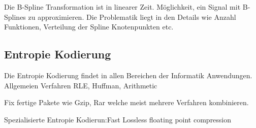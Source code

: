  Die B-Spline Transformation \cite{unser1993b:spline} ist in linearer Zeit. Möglichkeit, ein Signal mit B-Splines zu approximieren. Die Problematik liegt in den Details wie Anzahl Funktionen, Verteilung der Spline Knotenpunkten etc.

\subsection{Entropie Kodierung}
Die Entropie Kodierung findet in allen Bereichen der Informatik Anwendungen. Allgemeien Verfahren RLE, Huffman, Arithmetic

Fix fertige Pakete wie Gzip, Rar welche meist mehrere Verfahren kombinieren.

Spezialisierte Entropie Kodierun:Fast Lossless floating point compression \cite{ratanaworabhan2006fast}